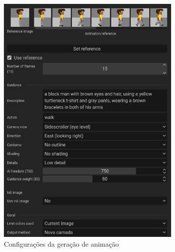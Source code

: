 \begin{figure}[htbp]
    \centering
    \caption{\small Processo da utilização 11 da ferramenta de animação do PixelLab em julho/2025}
    \label{fig:pixelLabAnimacao11}

    \begin{subfigure}{0.6\linewidth}
        \includegraphics[width=1\linewidth]{figs/pixelLab/dia4/tela6.PNG}
        \caption{\small Configurações da geração de animação}
        \label{fig:pixelLabAnimacao11a}
    \end{subfigure}
    \begin{subfigure}{0.35\linewidth}

\end{subfigure}
\end{figure}
